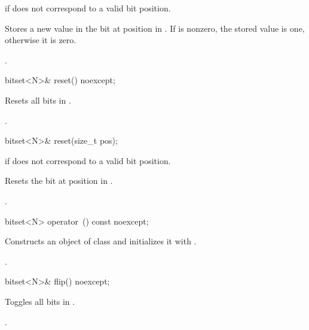 \begin{itemdescr}
\pnum
\throws
{}
if  does not correspond to a valid bit position.%

\pnum
\effects
Stores a new value in the bit at position  in
.
If  is nonzero, the stored value is one, otherwise it is zero.

\pnum
\returns
{}.
\end{itemdescr}

%
\begin{itemdecl}
bitset<N>& reset() noexcept;
\end{itemdecl}

\begin{itemdescr}
\pnum
\effects
Resets all bits in
.

\pnum
\returns
{}.
\end{itemdescr}

%
\begin{itemdecl}
bitset<N>& reset(size_t pos);
\end{itemdecl}

\begin{itemdescr}
\pnum
\throws
{}
if  does not correspond to a valid bit position.
%

\pnum
\effects
Resets the bit at position  in
.

\pnum
\returns
{}.
\end{itemdescr}

%
\begin{itemdecl}
bitset<N> operator~() const noexcept;
\end{itemdecl}

\begin{itemdescr}
\pnum
\effects
Constructs an object  of class
and initializes it with
.

\pnum
\returns
{}.
\end{itemdescr}

%
\begin{itemdecl}
bitset<N>& flip() noexcept;
\end{itemdecl}

\begin{itemdescr}
\pnum
\effects
Toggles all bits in
.

\pnum
\returns
{}.
\end{itemdescr}


